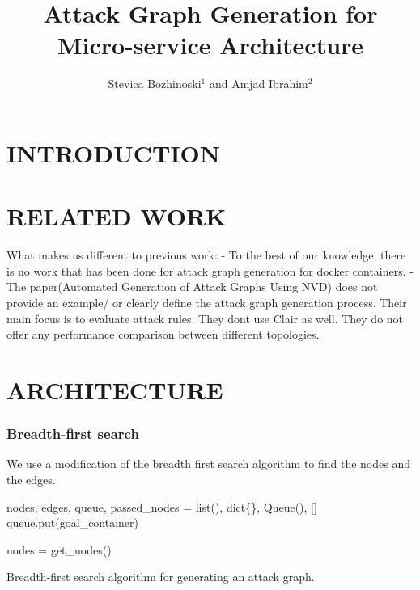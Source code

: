 \documentclass[letterpaper, 10 pt, conference]{ieeeconf}  %
\title{\LARGE \bf
Attack Graph Generation for Micro-service
Architecture
}
\author{Stevica Bozhinoski$^{1}$ and Amjad Ibrahim$^{2}$%
}
\begin{document}
\maketitle
\thispagestyle{empty}
\pagestyle{empty}


\begin{abstract}


\end{abstract}


\section{INTRODUCTION}

\section{RELATED WORK}

What makes us different to previous work:
- To the best of our knowledge, there is no work that has been done for attack graph generation for docker containers.
- The paper(Automated Generation of Attack Graphs Using NVD) does not provide an example/ or clearly define the attack graph generation process. Their main focus is to evaluate attack rules. They dont use Clair as well. They do not offer any performance comparison between different topologies. 

\section{ARCHITECTURE}

\subsubsection{Breadth-first search}

We use a modification of the breadth first search algorithm to find the nodes and the edges.
\begin{algorithm}
	\SetAlgoLined
	nodes, edges, queue, passed\_nodes = list(), dict\{\}, Queue(), []\;
	queue.put(goal\_container)\;
	
	nodes = get\_nodes()\;

\caption{Breadth-first search algorithm for generating an attack graph.}
\end{algorithm}
\end{document}
